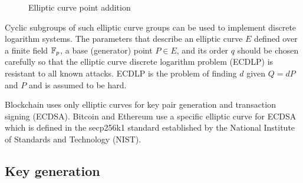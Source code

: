 \begin{figure}
  \centering
  \caption{Elliptic curve point addition}
\end{figure}

Cyclic subgroups of such elliptic curve groups can be used to implement discrete logarithm systems. The parameters that describe an elliptic curve $E$ defined over a finite field $\mathbb{F}_p$, a base (generator) point $P \in E$, and its order $q$ should be chosen carefully so that the elliptic curve discrete logarithm problem (ECDLP) is resistant to all known attacks. ECDLP is the problem of finding $d$ given $Q = dP$ and $P$ and is assumed to be hard.

Blockchain uses only elliptic curves for key pair generation and transaction signing (ECDSA). Bitcoin and Ethereum use a specific elliptic curve for ECDSA which is defined in the secp256k1 standard established by the National Institute of Standards and Technology (NIST).

\subsection[Key generation]{Key generation~\cite{elliptic_curves_2}}
\label{preliminaries:el_curves:key_gen}


